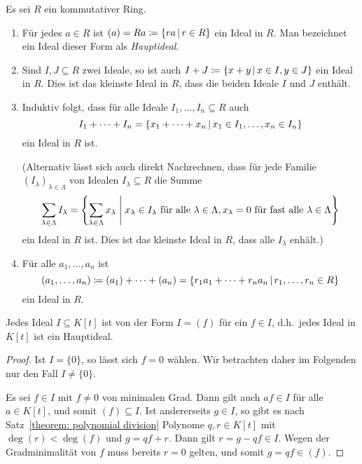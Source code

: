 \begin{example}
  Es sei $R$ ein kommutativer Ring.
  \begin{enumerate}
    \item
      Für jedes $a \in R$ ist $(a) = Ra \coloneqq \{ra \,|\, r \in R\}$ ein Ideal in $R$.
      Man bezeichnet ein Ideal dieser Form als \emph{Hauptideal}.
    \item
      Sind $I, J \subseteq R$ zwei Ideale, so ist auch $I + J \coloneqq \{x + y \,|\, x \in I, y \in J\}$ ein Ideal in $R$.
      Dies ist das kleinste Ideal in $R$, dass die beiden Ideale $I$ und $J$ enthält.
    \item
      Induktiv folgt, dass für alle Ideale $I_1, \dotsc, I_n \subseteq R$ auch
      \[
          I_1 + \dotsb + I_n
        = \{ x_1 + \dotsb + x_n \,|\, x_1 \in I_1, \dotsc, x_n \in I_n \}
      \]
      ein Ideal in $R$ ist.
      
      (Alternativ lässt sich auch direkt Nachrechnen, dass für jede Familie $(I_\lambda)_{\lambda \in \Lambda}$ von Idealen $I_\lambda \subseteq R$ die Summe
      \[
          \sum_{\lambda \in \Lambda} I_\lambda
        = \left\{
            \sum_{\lambda \in \Lambda} x_\lambda
          \;\middle|\;
            \text{$x_\lambda \in I_\lambda$ für alle $\lambda \in \Lambda$},
            \text{$x_\lambda = 0$ für fast alle $\lambda \in \Lambda$}
          \right\}
      \]
      ein Ideal in $R$ ist.
      Dies ist das kleinste Ideal in $R$, dass alle $I_\lambda$ enhält.)
    \item
      Für alle $a_1, \dotsc, a_n$ ist
      \[
                  (a_1, \dotsc, a_n)
        \coloneqq (a_1) + \dotsb + (a_n)
        =         \{ r_1 a_1 + \dotsb + r_n a_n \,|\, r_1, \dotsc, r_n \in R \}
      \]
      ein Ideal in $R$.
  \end{enumerate}
\end{example}

\begin{proposition}
  \label{proposition: the polynomial ring is a principal ideal domain}
  Jedes Ideal $I \subseteq K[t]$ ist von der Form $I = (f)$ für ein $f \in I$, d.h.\ jedes Ideal in $K[t]$ ist ein Hauptideal.
\end{proposition}

\begin{proof}
  Ist $I = \{0\}$, so lässt sich $f = 0$ wählen.
  Wir betrachten daher im Folgenden nur den Fall $I \neq \{0\}$.
  
  Es sei $f \in I$ mit $f \neq 0$ von minimalen Grad.
  Dann gilt auch $af \in I$ für alle $a \in K[t]$, und somit $(f) \subseteq I$.
  Ist andererseits $g \in I$, so gibt es nach Satz~\ref{theorem: polynomial division} Polynome $q, r \in K[t]$ mit $\deg(r) < \deg(f)$ und $g = q f + r$.
  Dann gilt $r = g - qf \in I$.
  Wegen der Gradminimalität von $f$ muss bereits $r = 0$ gelten, und somit $g = q f \in (f)$.
\end{proof}

